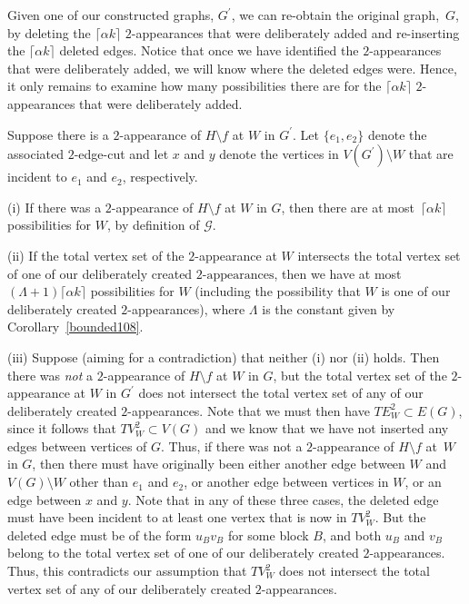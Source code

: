 \documentclass{article}
\newtheorem{Proof of Theorem}{Proof of Theorem}
\begin{document}
Given one of our constructed graphs, $G^{\prime}$,
we can re-obtain the original graph,~$G$,
by deleting the $\lceil \alpha k \rceil$ $2$-appearances that were deliberately added
and re-inserting the $\lceil \alpha k \rceil$ deleted edges.
Notice that once we have identified the $2$-appearances that were deliberately added,
we will know where the deleted edges were.
Hence, it only remains to examine how many possibilities there are 
for the $\lceil \alpha k \rceil$ $2$-appearances that were deliberately added. 

Suppose there is a $2$-appearance of $H \setminus f$ at $W$ in $G^{\prime}$.
Let $\{ e_{1},e_{2} \}$ denote the associated $2$-edge-cut
and let $x$ and $y$ denote the vertices in $V(G^{\prime}) \setminus W$ 
that are incident to $e_{1}$ and $e_{2}$, respectively. 

(i) If there was a $2$-appearance of $H \setminus f$ at $W$ in $G$,
then there are at most~$\lceil \alpha k \rceil$ possibilities for $W$,
by definition of $\mathcal{G}$.

(ii) If the total vertex set of the $2$-appearance at $W$ intersects 
the total vertex set of one of our deliberately created $2 \textrm{-appearances}$,
then we have at most $(\Lambda + 1) \lceil \alpha k \rceil$ possibilities for $W$
(including the possibility that $W$ is one of our deliberately created $2$-appearances),
where $\Lambda$ is the constant given by Corollary~\ref{bounded108}.

(iii) Suppose (aiming for a contradiction) that neither (i) nor (ii) holds.
Then there was \textit{not} a $2$-appearance of $H \setminus f$ at $W$ in $G$,
but the total vertex set of the $2$-appearance at $W$ in $G^{\prime}$
does not intersect the total vertex set of any of our deliberately created $2$-appearances.
Note that we must then have $TE_{W}^{2} \subset E(G)$,
since it follows that $TV_{W}^{2} \subset V(G)$
and we know that we have not inserted any edges between vertices of $G$.
Thus, if there was not a $2$-appearance of $H \setminus f$ at~$W$ in $G$,
then there must have originally been either another edge between $W$ and $V(G) \setminus W$
other than $e_{1}$ and $e_{2}$,
or another edge between vertices in $W$,
or an edge between $x$ and $y$.
Note that in any of these three cases,
the deleted edge must have been incident to at least one vertex that is now in $TV_{W}^{2}$.
But the deleted edge must be of the form $u_{B}v_{B}$ for some block $B$,
and both $u_{B}$ and $v_{B}$ belong to the total vertex set of one of our deliberately created $2$-appearances.
Thus, this contradicts our assumption that $TV_{W}^{2}$ does not intersect
the total vertex set of any of our deliberately created $2$-appearances. \\
\end{document}
